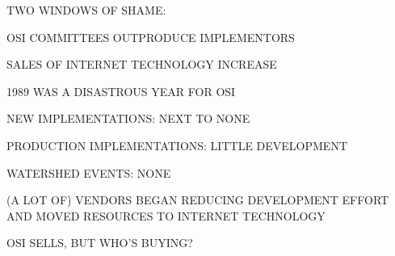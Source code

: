 \begin{bwslide}

\begin{nrtc}
\item	TWO WINDOWS OF SHAME:
    \begin{nrtc}
    \item	OSI COMMITTEES OUTPRODUCE IMPLEMENTORS

    \item	SALES OF INTERNET TECHNOLOGY INCREASE
    \end{nrtc}

\item	1989 WAS A DISASTROUS YEAR FOR OSI
    \begin{nrtc}
    \item	NEW IMPLEMENTATIONS: NEXT TO NONE

    \item	PRODUCTION IMPLEMENTATIONS: LITTLE DEVELOPMENT

    \item	WATERSHED EVENTS: NONE

    \item	(A LOT OF) VENDORS BEGAN REDUCING DEVELOPMENT EFFORT AND
		MOVED RESOURCES TO INTERNET TECHNOLOGY
    \end{nrtc}

\item	OSI SELLS, BUT WHO'S BUYING?
\end{nrtc}
\end{bwslide}



